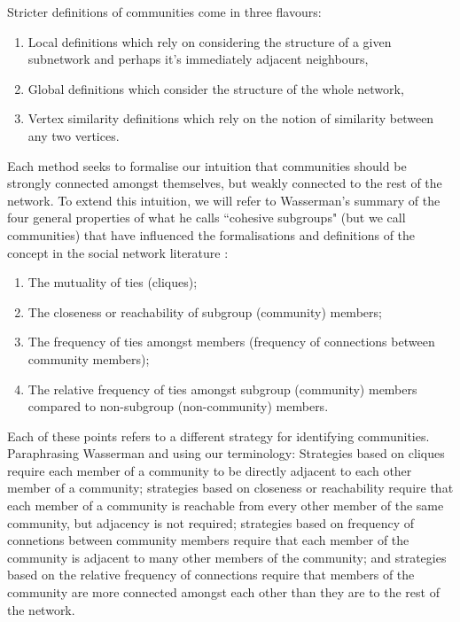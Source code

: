 Stricter definitions of communities come in three flavours:

\begin{enumerate}
    \item Local definitions which rely on considering the structure of a given subnetwork and perhaps it's immediately adjacent neighbours,
    \item Global definitions which consider the structure of the whole network,
    \item Vertex similarity definitions which rely on the notion of similarity between any two vertices.
\end{enumerate}

Each method seeks to formalise our intuition that communities should be strongly connected amongst themselves, but weakly connected to the rest of the network. To extend this intuition, we will refer to Wasserman's summary of the four general properties of what he calls ``cohesive subgroups" (but we call communities) that have influenced the formalisations and definitions of the concept in the social network literature \cite[251-252]{wasserman_faust_1994}:

\begin{enumerate}
    \item The mutuality of ties (cliques);
    \item The closeness or reachability of subgroup (community) members;
    \item The frequency of ties amongst members (frequency of connections between community members);
    \item The relative frequency of ties amongst subgroup (community) members compared to non-subgroup (non-community) members.
\end{enumerate}

Each of these points refers to a different strategy for identifying communities. Paraphrasing Wasserman and using our terminology: Strategies based on cliques require each member of a community to be directly adjacent to each other member of a community; strategies based on closeness or reachability require that each member of a community is reachable from every other member of the same community, but adjacency is not required; strategies based on frequency of connetions between community members require that each member of the community is adjacent to many other members of the community; and strategies based on the relative frequency of connections require that members of the community are more connected amongst each other than they are to the rest of the network.

